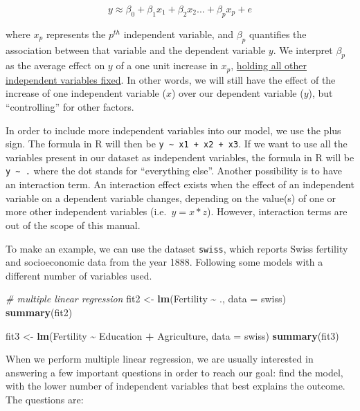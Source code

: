 \documentclass[
]{article}
\newenvironment{Shaded}{\begin{snugshade}}{\end{snugshade}}
\newcommand{\AttributeTok}[1]{\textcolor[rgb]{0.13,0.29,0.53}{#1}}
\newcommand{\CommentTok}[1]{\textcolor[rgb]{0.56,0.35,0.01}{\textit{#1}}}
\newcommand{\FunctionTok}[1]{\textcolor[rgb]{0.13,0.29,0.53}{\textbf{#1}}}
\newcommand{\NormalTok}[1]{#1}
\newcommand{\OtherTok}[1]{\textcolor[rgb]{0.56,0.35,0.01}{#1}}
\newcommand{\SpecialCharTok}[1]{\textcolor[rgb]{0.81,0.36,0.00}{\textbf{#1}}}
\begin{document}
\begin{equation}
y\approx\beta_0+\beta_1x_1+\beta_2x_2...+\beta_px_p+e
\label{eq:mlr}
\end{equation}

where \(x_p\) represents the \(p^{th}\) independent variable, and \(\beta_p\)
quantifies the association between that variable and the dependent
variable \(y\). We interpret \(\beta_p\) as the average effect on \(y\) of a
one unit increase in \(x_p\), \ul{holding all other independent variables
fixed}. In other words, we will still have the effect of the
increase of one independent variable (\(x\)) over our dependent variable
(\(y\)), but ``controlling'' for other factors.

In order to include more independent variables into our model, we use
the plus sign. The formula in R will then be \texttt{y\ \textasciitilde{}\ x1\ +\ x2\ +\ x3}. If we
want to use all the variables present in our dataset as independent
variables, the formula in R will be \texttt{y\ \textasciitilde{}\ .} where the dot stands for
``everything else''. Another possibility is to have an interaction term.
An interaction effect exists when the effect of an independent variable
on a dependent variable changes, depending on the value(s) of one or
more other independent variables (i.e.~\(y=x*z\)). However, interaction
terms are out of the scope of this manual.

To make an example, we can use the dataset \texttt{swiss}, which reports Swiss
fertility and socioeconomic data from the year 1888. Following some
models with a different number of variables used.

\begin{Shaded}
\begin{Highlighting}[]
\CommentTok{\# multiple linear regression}
\NormalTok{fit2 }\OtherTok{\textless{}{-}} \FunctionTok{lm}\NormalTok{(Fertility }\SpecialCharTok{\textasciitilde{}}\NormalTok{ ., }\AttributeTok{data =}\NormalTok{ swiss)}
\FunctionTok{summary}\NormalTok{(fit2)}

\NormalTok{fit3 }\OtherTok{\textless{}{-}} \FunctionTok{lm}\NormalTok{(Fertility }\SpecialCharTok{\textasciitilde{}}\NormalTok{ Education }\SpecialCharTok{+}\NormalTok{ Agriculture, }\AttributeTok{data =}\NormalTok{ swiss)}
\FunctionTok{summary}\NormalTok{(fit3)}
\end{Highlighting}
\end{Shaded}

When we perform multiple linear regression, we are usually interested in
answering a few important questions in order to reach our goal: find the
model, with the lower number of independent variables that best explains
the outcome. The questions are:
\end{document}
